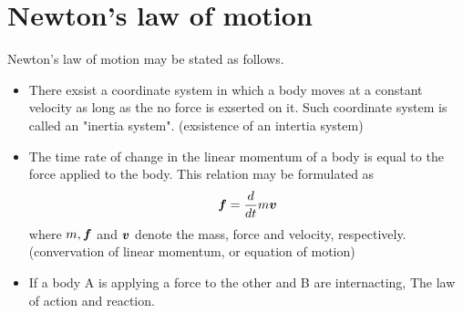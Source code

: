 \documentclass[10pt,a4j]{article}
\begin{document}
\section{Newton's law of motion}
Newton's law of motion may be stated as follows.
\begin{itemize}
\item 
	There exsist a coordinate system in which a body moves at a constant velocity as long as the 
	no force is exserted on it. Such coordinate system is called an "inertia system".
		(exsistence of an intertia system)
\item
	The time rate of change in the linear momentum of a body is equal to the force applied to the body. 
	This relation may be formulated as 
	\[
		\mbox{\boldmath $f$}=\frac{d}{dt}m\mbox{\boldmath $v$}
	\]
		where $m, \mbox{\boldmath $f$}$ and $\mbox{\boldmath $v$}$ denote the mass, force and velocity, respectively. 
	(convervation of linear momentum, or equation of motion)
\item
	If a body A is applying a force to the other and B are internacting, 
	The law of action and reaction.
\end{itemize}
\end{document}
